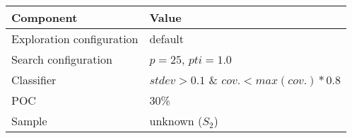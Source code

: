 \begin{tabular}{ll}
\hline
Component                    & Value         \\
\hline
Exploration configuration   & default          \\
Search configuration        & $p = 25$, $pti = 1.0$          \\
Classifier                  & $stdev > 0.1$ \& $cov. < max(cov.) * 0.8$          \\
POC                         & 30\%          \\
Sample                      & unknown ($S_2$) \\
\hline
\end{tabular}